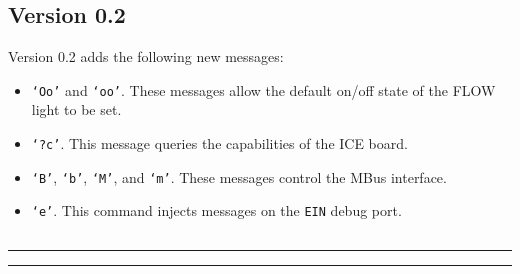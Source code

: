\subsection{Version 0.2}
\label{protocol-0-2}

Version 0.2 adds the following new messages:
\begin{itemize}
  \item {\tt `Oo'} and {\tt `oo'}. These messages allow the default on/off state of
the FLOW light to be set.
  \item {\tt `?c'}. This message queries the capabilities of the ICE board.
  \item {\tt `B'}, {\tt `b'}, {\tt `M'}, and {\tt `m'}. These messages control
    the MBus interface.
  \item {\tt `e'}. This command injects messages on the {\tt EIN} debug port.
\end{itemize}

\setcounter{tocdepth}{4}
\etocsettocstyle
    {\subsection*{\contentsname}\hrule\medskip
        }
    {\nobreak\medskip\hrule\bigskip}

\localtableofcontents

